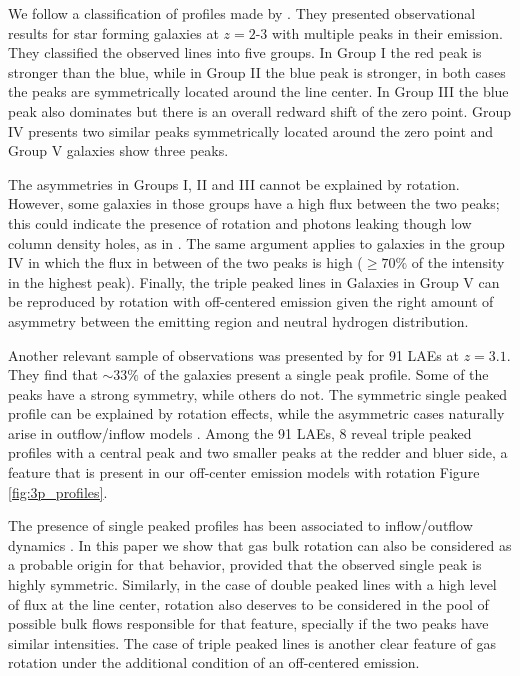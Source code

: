 \documentclass{emulateapj}
\newcommand{\ly}{{\ifmmode{{\rm Ly}\alpha~}\else{Ly$\alpha$~}\fi}}
\begin{document}
We follow a classification of \ly profiles made by
\cite{Kulas12}. They presented observational results for star forming
galaxies at $z=2$-$3$ with multiple peaks in their \ly emission.
They classified the observed lines into five groups. In Group I the
red peak is stronger than the blue, while in Group II the blue peak is
stronger, in both cases the peaks are symmetrically located around the
line center. In Group III the blue peak also dominates but there is an
overall redward shift of the zero point. Group IV presents two similar
peaks symmetrically located around the zero point and Group V galaxies show
three peaks. 

The asymmetries in Groups I, II  and III cannot be explained by
rotation. However, some galaxies in those groups have a high flux between
the two peaks; this could indicate the presence of rotation 
and \ly photons leaking though low column density holes, as in \cite{Behrens2014}. The same argument applies to galaxies in the group IV in which the flux
in between of the two peaks is high ($ \geq 70 \%$ of the intensity in
the highest peak). Finally, the triple peaked lines in Galaxies in
Group V can be reproduced by rotation with off-centered
emission given the right amount of asymmetry between the emitting
region and neutral hydrogen distribution. 

Another relevant sample of observations was presented by \cite{Yamada2012} 
for 91 LAEs at $z=3.1$. They find that $\sim 33 \%$ of the galaxies present 
a single peak profile. Some of the peaks have a strong symmetry, while
others do not. The symmetric single peaked profile can be explained by
rotation effects, while the asymmetric cases naturally arise in
outflow/inflow models \citep{Ahn2014,Verhamme2008, Dijkstra06}. Among the 91
LAEs, 8 reveal triple peaked profiles with a central peak and two
smaller peaks at the redder and bluer side, a feature that is present
in our off-center emission models with rotation Figure \ref{fig:3p_profiles}. 

The presence of single peaked profiles has been associated to
inflow/outflow dynamics \citep{Verhamme06,DijkstraKramer}. In this
paper we show that gas bulk rotation can also be considered as a
probable origin for that behavior, provided that the observed single peak is highly
symmetric. Similarly, in the case of double peaked lines with a high
level of flux at the line center, rotation also deserves to be considered in
the pool of possible bulk flows responsible for that feature,
specially if the two peaks have similar intensities. The case of
triple peaked lines is another clear feature of gas rotation under the
additional condition of an off-centered emission. 
\end{document}
